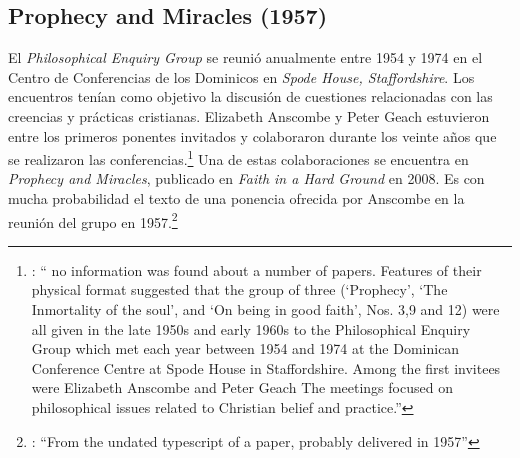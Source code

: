 \subsection{Prophecy and Miracles (1957)}

El \emph{Philosophical Enquiry Group} se reunió anualmente entre 1954 y 1974 en el Centro de Conferencias de los Dominicos en \emph{Spode House, Staffordshire}. Los encuentros tenían como objetivo la discusión de cuestiones relacionadas con las creencias y prácticas cristianas. Elizabeth Anscombe y Peter Geach estuvieron entre los primeros ponentes invitados y colaboraron durante los veinte años que se realizaron las conferencias.\footnote{\cite[Cf.~][x]{anscombe2008faith}: \enquote{\textelp{} no information was found about a number of papers. Features of their physical format suggested that the group of three (`Prophecy', `The Inmortality of the soul', and `On being in good faith', Nos. 3,9 and 12) were all given in the late 1950s and early 1960s to the Philosophical Enquiry Group which met each year between 1954 and 1974 at the Dominican Conference Centre at Spode House in Staffordshire. \textelp{} Among the first invitees were Elizabeth Anscombe and Peter Geach \textelp{} The meetings focused on philosophical issues related to Christian belief and practice.}} Una de estas colaboraciones se encuentra en \emph{Prophecy and Miracles}, publicado en \emph{Faith in a Hard Ground} en 2008. Es con mucha probabilidad el texto de una ponencia ofrecida por Anscombe en la reunión del grupo en 1957.\footnote{\cite[Cf.~][nota a pie de página 20]{anscombe2008faith:prophandmi}: \enquote{From the undated typescript of a paper, probably delivered in 1957}}

